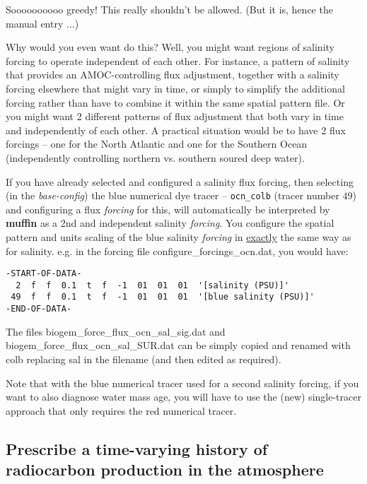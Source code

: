 \documentclass[11pt,fleqn]{book} %
\begin{document}
Soooooooooo greedy! This really shouldn't be allowed. (But it is, hence the manual entry ...)

Why would you even want do this? Well, you might want regions of salinity forcing to operate independent of each other. For instance, a pattern of salinity that provides an AMOC-controlling flux adjustment, together with a salinity forcing elsewhere that might vary in time, or simply to simplify the additional forcing rather than have to combine it within the same spatial pattern file. Or you might want 2 different patterns of flux adjustment that both vary in time and independently of each other. A practical situation would be to have 2 flux forcings -- one for the North Atlantic and one for the Southern Ocean (independently controlling northern vs. southern soured deep water).

If you have already selected and configured a salinity flux forcing, then selecting (in the \textit{base-config}) the blue numerical dye tracer -- \texttt{ocn\_colb} (tracer number \(49\)) and configuring a flux \textit{forcing} for this, will automatically be interpreted by \textbf{muffin} as a 2nd and independent salinity \textit{forcing}. You configure the spatial pattern and units scaling of the blue salinity \textit{forcing} in \uline{exactly} the same way as for salinity. e.g. in the forcing file \textsf{\footnotesize configure\_forcings\_ocn.dat}, you would have:

\vspace{-2mm}\small\begin{verbatim}
-START-OF-DATA-
  2  f  f  0.1  t  f  -1  01  01  01  '[salinity (PSU)]'
 49  f  f  0.1  t  f  -1  01  01  01  '[blue salinity (PSU)]'
-END-OF-DATA-
\end{verbatim}\normalsize\vspace{-2mm}

The files \textsf{\footnotesize biogem\_force\_flux\_ocn\_sal\_sig.dat} and \textsf{\footnotesize biogem\_force\_flux\_ocn\_sal\_SUR.dat} can be simply copied and renamed with \textsf{\footnotesize colb} replacing \textsf{\footnotesize sal} in the filename (and then edited as required).

Note that with the blue numerical tracer used for a second salinity forcing, if you want to also diagnose water mass age, you will have to use the (new) single-tracer approach that only requires the red numerical tracer.

%
\newpage
\subsection*{Prescribe a time-varying history of radiocarbon production in the atmosphere}
\vspace{1mm}
\end{document}
